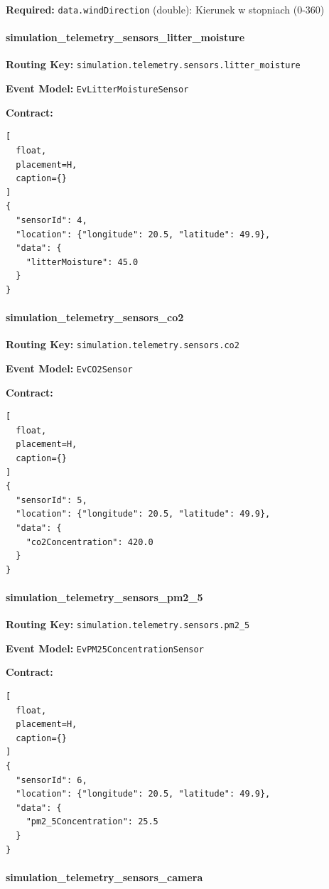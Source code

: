 \textbf{Required:} \texttt{data.windDirection} (double): Kierunek w stopniach (0-360)

\paragraph{simulation\_telemetry\_sensors\_litter\_moisture}

\textbf{Routing Key:} \texttt{simulation.telemetry.sensors.litter\_moisture}

\textbf{Event Model:} \texttt{EvLitterMoistureSensor}

\textbf{Contract:}
\begin{lstlisting}[
  float,
  placement=H,
  caption={}
]
{
  "sensorId": 4,
  "location": {"longitude": 20.5, "latitude": 49.9},
  "data": {
    "litterMoisture": 45.0
  }
}
\end{lstlisting}

\paragraph{simulation\_telemetry\_sensors\_co2}

\textbf{Routing Key:} \texttt{simulation.telemetry.sensors.co2}

\textbf{Event Model:} \texttt{EvCO2Sensor}

\textbf{Contract:}
\begin{lstlisting}[
  float,
  placement=H,
  caption={}
] 
{
  "sensorId": 5,
  "location": {"longitude": 20.5, "latitude": 49.9},
  "data": {
    "co2Concentration": 420.0
  }
}
\end{lstlisting}

\paragraph{simulation\_telemetry\_sensors\_pm2\_5}

\textbf{Routing Key:} \texttt{simulation.telemetry.sensors.pm2\_5}

\textbf{Event Model:} \texttt{EvPM25ConcentrationSensor}

\textbf{Contract:}
\begin{lstlisting}[
  float,
  placement=H,
  caption={}
] 
{
  "sensorId": 6,
  "location": {"longitude": 20.5, "latitude": 49.9},
  "data": {
    "pm2_5Concentration": 25.5
  }
}
\end{lstlisting}

\paragraph{simulation\_telemetry\_sensors\_camera}

